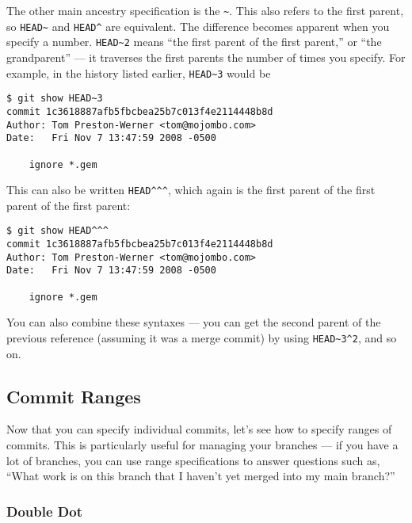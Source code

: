 \documentclass[a4paper]{book}
\begin{document}
The other main ancestry specification is the \texttt{\textasciitilde{}}. This also refers to the first parent, so \texttt{HEAD\textasciitilde{}} and \texttt{HEAD\^{}} are equivalent. The difference becomes apparent when you specify a number. \texttt{HEAD\textasciitilde{}2} means “the first parent of the first parent,” or “the grandparent” --- it traverses the first parents the number of times you specify. For example, in the history listed earlier, \texttt{HEAD\textasciitilde{}3} would be

\begin{shaded}\begin{verbatim}
$ git show HEAD~3
commit 1c3618887afb5fbcbea25b7c013f4e2114448b8d
Author: Tom Preston-Werner <tom@mojombo.com>
Date:   Fri Nov 7 13:47:59 2008 -0500

    ignore *.gem
\end{verbatim}\end{shaded}

This can also be written \texttt{HEAD\^{}\^{}\^{}}, which again is the first parent of the first parent of the first parent:

\begin{shaded}\begin{verbatim}
$ git show HEAD^^^
commit 1c3618887afb5fbcbea25b7c013f4e2114448b8d
Author: Tom Preston-Werner <tom@mojombo.com>
Date:   Fri Nov 7 13:47:59 2008 -0500

    ignore *.gem
\end{verbatim}\end{shaded}

You can also combine these syntaxes --- you can get the second parent of the previous reference (assuming it was a merge commit) by using \texttt{HEAD\textasciitilde{}3\^{}2}, and so on.

\subsection{Commit Ranges}\label{commit-ranges}

Now that you can specify individual commits, let's see how to specify ranges of commits. This is particularly useful for managing your branches --- if you have a lot of branches, you can use range specifications to answer questions such as, “What work is on this branch that I haven't yet merged into my main branch?”

\subsubsection{Double Dot}
\end{document}
